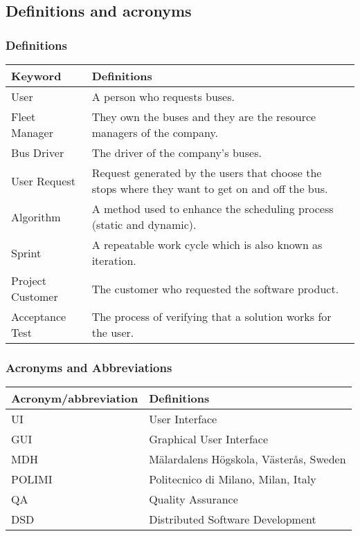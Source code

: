 \subsection{Definitions and acronyms} 
\subsubsection{Definitions}
\begin{center}
	\begin{tabular} { | m{3.5cm} | m{9.5cm} | }
		\hline
		\textbf{Keyword} & \textbf{Definitions}\\
		\hline
		User & A person who requests buses.\\
		\hline
		Fleet Manager & They own the buses and they are the resource managers of the company.\\
		\hline
		Bus Driver & The driver of the company's buses.\\
		\hline
		User Request & Request generated by the users that choose the stops where they want to get on and off the bus.\\
		\hline
		Algorithm & A method used to enhance the scheduling process (static and dynamic).\\
		\hline
		Sprint & A repeatable work cycle which is also known as iteration.\\
		\hline
		Project Customer & The customer who requested the software product.\\
		\hline
		Acceptance Test & The process of verifying that a solution works for the user.\\
		\hline
	\end{tabular}
\end{center}
\subsubsection{Acronyms and Abbreviations}
\begin{center}
	\begin{tabular} { | m{5cm} | m{8cm} | }
		\hline
		\textbf{Acronym/abbreviation} & \textbf{Definitions}\\
		\hline
		UI & User Interface\\
		\hline
		GUI & Graphical User Interface\\
		\hline
		MDH & M\"{a}lardalens H\"{o}gskola, V\"{a}ster\r{a}s, Sweden\\
		\hline
		POLIMI & Politecnico di Milano, Milan, Italy\\
		\hline
		QA & Quality Assurance\\
		\hline
		DSD & Distributed Software Development\\
		\hline
	\end{tabular}
\end{center}

